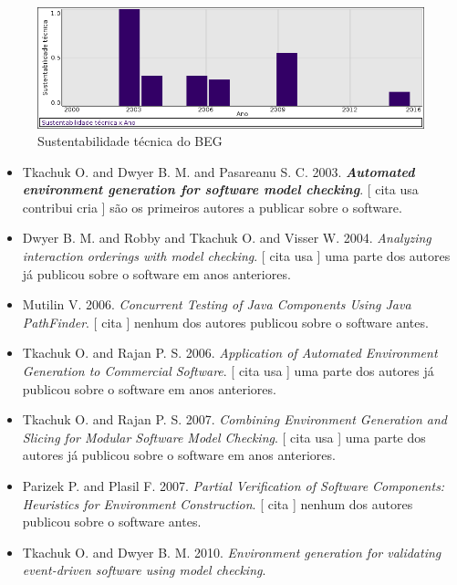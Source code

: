 \begin{figure}[h]
  \center
  \includegraphics[scale=0.50]{imagens/softwares-charts/beg.png}
  \caption{Sustentabilidade técnica do BEG}
\end{figure}


\begin{itemize}
\item Tkachuk O. and Dwyer B. M. and Pasareanu S. C.
      2003.
        \textbf{\textit{ Automated environment generation for software model checking}}.
      [
          cita
          usa
          contribui
          cria
      ]
são os primeiros autores a publicar sobre o software.
\item Dwyer B. M. and Robby and Tkachuk O. and Visser W.
      2004.
        \textit{ Analyzing interaction orderings with model checking}.
      [
          cita
          usa
      ]
uma parte dos autores já publicou sobre o software em anos anteriores.
\item Mutilin V.
      2006.
        \textit{ Concurrent Testing of Java Components Using Java PathFinder}.
      [
          cita
      ]
nenhum dos autores publicou sobre o software antes.
\item Tkachuk O. and Rajan P. S.
      2006.
        \textit{ Application of Automated Environment Generation to Commercial Software}.
      [
          cita
          usa
      ]
uma parte dos autores já publicou sobre o software em anos anteriores.
\item Tkachuk O. and Rajan P. S.
      2007.
        \textit{ Combining Environment Generation and Slicing for Modular Software Model Checking}.
      [
          cita
          usa
      ]
uma parte dos autores já publicou sobre o software em anos anteriores.
\item Parizek P. and Plasil F.
      2007.
        \textit{ Partial Verification of Software Components: Heuristics for Environment Construction}.
      [
          cita
      ]
nenhum dos autores publicou sobre o software antes.
\item Tkachuk O. and Dwyer B. M.
      2010.
        \textit{ Environment generation for validating event-driven software using model checking}.

\end{itemize}
